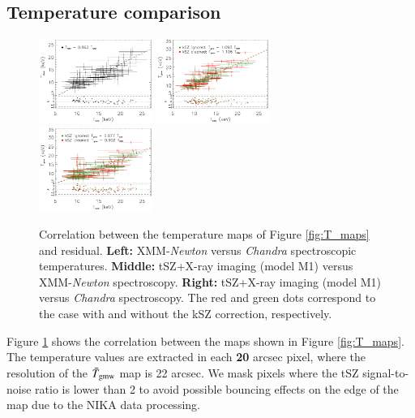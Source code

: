 \documentclass[twocolumn,traditabstract]{aa}
\begin{document}
\subsection{Temperature comparison}\label{sec:compT}
\begin{figure}[h]
\centering
\includegraphics[width=0.33\textwidth]{Figure/Thermo_correlation_TXMM-TCXO.pdf}
\includegraphics[width=0.33\textwidth]{Figure/Thermo_correlation_TXMM-TSZ_leff1.pdf}
\includegraphics[width=0.33\textwidth]{Figure/Thermo_correlation_TCXO-TSZ_leff1.pdf}
\caption{\footnotesize{Correlation between the temperature maps of Figure \ref{fig:T_maps} and residual. {\bf Left:} XMM-\textit{Newton} versus \textit{Chandra} spectroscopic temperatures. {\bf Middle:} tSZ+X-ray imaging (model M1) versus XMM-\textit{Newton} spectroscopy. {\bf Right:} tSZ+X-ray imaging (model M1) versus \textit{Chandra} spectroscopy. The red and green dots correspond to the case with and without the kSZ correction, respectively.}}
\label{fig:T_SZ_T_X_correlation}
\end{figure}

Figure \ref{fig:T_SZ_T_X_correlation} shows the correlation between the maps shown in Figure \ref{fig:T_maps}. The temperature values are extracted in each {\bf 20} arcsec pixel, where the resolution of the $\bar{T}_{\rm gmw}$ map is 22 arcsec. We mask pixels where the tSZ signal-to-noise ratio is lower than 2 to avoid possible bouncing effects on the edge of the map due to the NIKA data processing.
\end{document}
